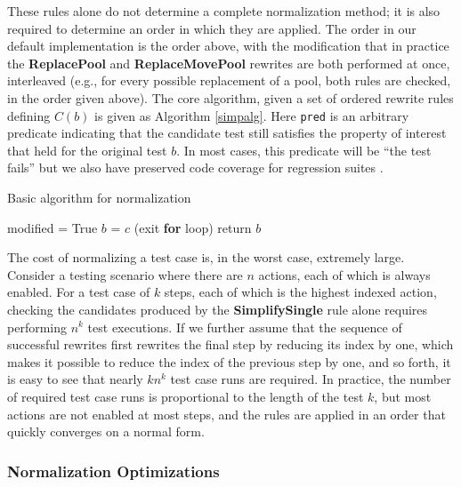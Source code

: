 These rules alone do not determine a complete normalization method; it is
also required to determine an order in which they are applied.  The
order in our default implementation is the order above, with the
modification that in practice the {\bf ReplacePool} and {\bf
  ReplaceMovePool} rewrites are both performed at once, interleaved
(e.g., for every possible replacement of a pool, both rules are
checked, in the order given above).  The core algorithm, given a set
of ordered rewrite rules defining $C(b)$ is given as Algorithm
\ref{simpalg}.  Here {\tt pred} is an arbitrary predicate indicating
that the candidate test still satisfies the property of interest that
held for the original test $b$.  In most cases, this predicate will be
``the test fails'' but we also have preserved
code coverage for regression suites \cite{icst2014}.

\begin{algorithm}
\caption{Basic algorithm for normalization}
\label{simpalg}
\begin{algorithmic}[1]
\State modified = True
\State $b$ = $c$
 (exit {\bf for} loop)
\EndIf
\EndFor
\EndWhile
\State return $b$
\end{algorithmic}
\end{algorithm}

The cost of normalizing a test case is, in the worst case, extremely
large.  Consider a testing scenario where there are $n$ actions, each
of which is always enabled.  For a test case of $k$ steps, each of
which is the highest indexed action, checking the candidates produced
by the {\bf SimplifySingle} rule alone requires performing $n^k$
test executions.  If we further assume that the sequence of successful rewrites
first rewrites the final step by reducing its index by one, which
makes it possible to reduce the index of the previous step by one, and
so forth, it is easy to see that nearly $k n^k$ test case runs are
required.  In practice, the number of required test case runs is
proportional to the length of the test $k$, but most actions are not
enabled at most steps, and the rules are applied in an order that
quickly converges on a normal form.

\subsubsection{Normalization Optimizations}


